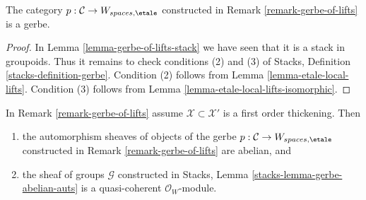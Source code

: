 \begin{lemma}
\label{lemma-gerbe-of-lifts}
The category $p : \mathcal{C} \to W_{spaces, \etale}$ constructed
in Remark \ref{remark-gerbe-of-lifts} is a gerbe.
\end{lemma}

\begin{proof}
In Lemma \ref{lemma-gerbe-of-lifts-stack}
we have seen that it is a stack in groupoids.
Thus it remains to check conditions (2) and (3) of
Stacks, Definition \ref{stacks-definition-gerbe}.
Condition (2) follows from
Lemma \ref{lemma-etale-local-lifts}.
Condition (3) follows from
Lemma \ref{lemma-etale-local-lifts-isomorphic}.
\end{proof}

\begin{lemma}
\label{lemma-gerbe-of-lifts-first-order}
In Remark \ref{remark-gerbe-of-lifts} assume $\mathcal{X} \subset \mathcal{X}'$
is a first order thickening. Then
\begin{enumerate}
\item the automorphism sheaves of objects of the gerbe
$p : \mathcal{C} \to W_{spaces, \etale}$ constructed
in Remark \ref{remark-gerbe-of-lifts} are abelian, and
\item the sheaf of groups $\mathcal{G}$ constructed in
Stacks, Lemma \ref{stacks-lemma-gerbe-abelian-auts}
is a quasi-coherent $\mathcal{O}_W$-module.
\end{enumerate}
\end{lemma}


